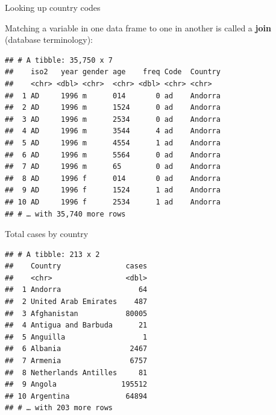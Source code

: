 \documentclass[ignorenonframetext,]{beamer}
\newenvironment{Shaded}{\begin{snugshade}}{\end{snugshade}}
\newcommand{\DataTypeTok}[1]{\textcolor[rgb]{0.13,0.29,0.53}{#1}}
\newcommand{\KeywordTok}[1]{\textcolor[rgb]{0.13,0.29,0.53}{\textbf{#1}}}
\newcommand{\NormalTok}[1]{#1}
\newcommand{\OperatorTok}[1]{\textcolor[rgb]{0.81,0.36,0.00}{\textbf{#1}}}
\newcommand{\StringTok}[1]{\textcolor[rgb]{0.31,0.60,0.02}{#1}}
\begin{document}
\begin{frame}[fragile]{Looking up country codes}
\protect\hypertarget{looking-up-country-codes}{}

Matching a variable in one data frame to one in another is called a
\textbf{join} (database terminology):

\begin{Shaded}
\end{Shaded}

\begin{verbatim}
## # A tibble: 35,750 x 7
##    iso2   year gender age    freq Code  Country
##    <chr> <dbl> <chr>  <chr> <dbl> <chr> <chr>  
##  1 AD     1996 m      014       0 ad    Andorra
##  2 AD     1996 m      1524      0 ad    Andorra
##  3 AD     1996 m      2534      0 ad    Andorra
##  4 AD     1996 m      3544      4 ad    Andorra
##  5 AD     1996 m      4554      1 ad    Andorra
##  6 AD     1996 m      5564      0 ad    Andorra
##  7 AD     1996 m      65        0 ad    Andorra
##  8 AD     1996 f      014       0 ad    Andorra
##  9 AD     1996 f      1524      1 ad    Andorra
## 10 AD     1996 f      2534      1 ad    Andorra
## # … with 35,740 more rows
\end{verbatim}

\end{frame}

\begin{frame}[fragile]{Total cases by country}
\protect\hypertarget{total-cases-by-country}{}

\begin{Shaded}
\end{Shaded}

\begin{verbatim}
## # A tibble: 213 x 2
##    Country               cases
##    <chr>                 <dbl>
##  1 Andorra                  64
##  2 United Arab Emirates    487
##  3 Afghanistan           80005
##  4 Antigua and Barbuda      21
##  5 Anguilla                  1
##  6 Albania                2467
##  7 Armenia                6757
##  8 Netherlands Antilles     81
##  9 Angola               195512
## 10 Argentina             64894
## # … with 203 more rows
\end{verbatim}

\end{frame}
\end{document}
